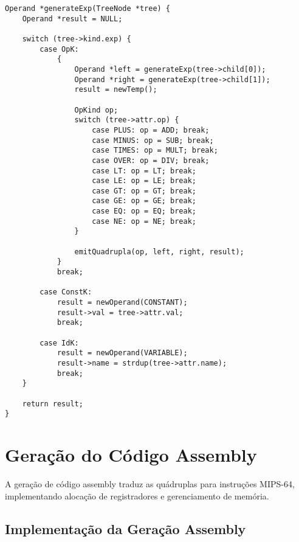 \documentclass[
	12pt,				%
	oneside,
	a4paper,			%
	english,			%
	french,				%
	spanish,			%
	brazil,				%
	]{abntex2}
\begin{document}
\begin{lstlisting}[style=cstyle, caption=Geração de código para expressões]
Operand *generateExp(TreeNode *tree) {
    Operand *result = NULL;
    
    switch (tree->kind.exp) {
        case OpK:
            {
                Operand *left = generateExp(tree->child[0]);
                Operand *right = generateExp(tree->child[1]);
                result = newTemp();
                
                OpKind op;
                switch (tree->attr.op) {
                    case PLUS: op = ADD; break;
                    case MINUS: op = SUB; break;
                    case TIMES: op = MULT; break;
                    case OVER: op = DIV; break;
                    case LT: op = LT; break;
                    case LE: op = LE; break;
                    case GT: op = GT; break;
                    case GE: op = GE; break;
                    case EQ: op = EQ; break;
                    case NE: op = NE; break;
                }
                
                emitQuadrupla(op, left, right, result);
            }
            break;
            
        case ConstK:
            result = newOperand(CONSTANT);
            result->val = tree->attr.val;
            break;
            
        case IdK:
            result = newOperand(VARIABLE);
            result->name = strdup(tree->attr.name);
            break;
    }
    
    return result;
}
\end{lstlisting}

\section{Geração do Código Assembly}

A geração de código assembly traduz as quádruplas para instruções MIPS-64, implementando alocação de registradores e gerenciamento de memória.

\subsection{Implementação da Geração Assembly}
\end{document}
